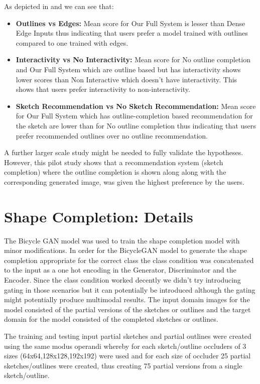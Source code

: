 As depicted in  and  we can see that:

\begin{itemize}
    \item \textbf{Outlines vs Edges:} Mean score for Our Full System is lesser than Dense Edge Inputs thus indicating that users prefer a model trained with outlines compared to one trained with edges.
    \item \textbf{Interactivity vs No Interactivity:} Mean score for No outline completion and Our Full System which are outline based but has interactivity shows lower scores than Non Interactive which doesn't have interactivity. This shows that users prefer interactivity to non-interactivity.
    \item \textbf{Sketch Recommendation vs No Sketch Recommendation:} Mean score for Our Full System which has outline-completion based recommendation for the sketch are lower than for No outline completion thus indicating that users prefer recommended outlines over no outline recommendation.
\end{itemize}

A further larger scale study might be needed to fully validate the hypotheses. However, this pilot study shows that a recommendation system (sketch completion) where the outline completion is shown along along with the corresponding generated image, was given the highest preference by the users.



\section{Shape Completion: Details}

The Bicycle GAN model \cite{zhu2017toward} was used to train the shape completion model with minor modifications. In order for the BicycleGAN model to generate the shape completion appropriate for the correct class the class condition was concatenated to the input as a one hot encoding in the Generator, Discriminator and the Encoder. Since the class condition worked decently we didn't try introducing gating in those scenarios but it can potentially be introduced although the gating might potentially produce multimodal results. The input domain images for the model consisted of the partial versions of the sketches or outlines and the target domain for the model consisted of the completed sketches or outlines. 

The training and testing input partial sketches and partial outlines were created using the same modus operandi whereby for each sketch/outline occluders of 3 sizes (64x64,128x128,192x192) were used and for each size of occluder 25 partial sketches/outlines were created, thus creating 75 partial versions from a single sketch/outline.


